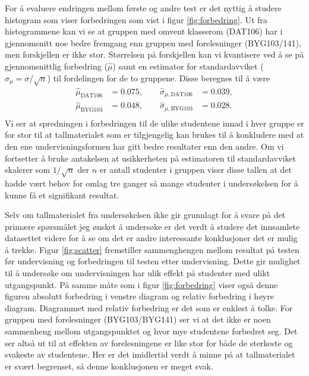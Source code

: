 \documentclass[a4paper,norsk,12pt]{report}
\begin{document}
For å evaluere endringen mellom første og andre test er det nyttig å studere histogram som viser forbedringen som vist i figur \ref{fig:forbedring}. Ut fra histogrammene kan vi se at gruppen med omvent klasserom (DAT106) har i gjennomsnitt noe bedre fremgang enn gruppen med forelesninger (BYG103/141), men forskjellen er ikke stor. Størrelsen på forskjellen kan vi kvantisere ved å se på gjennomsnittlig forbedring ($\hat{\mu}$) samt en estimator for standardavviket ($\hat{\sigma}_\mu = \sigma/\sqrt{n}$) til fordelingen for de to gruppene. Disse beregnes til å være
\begin{displaymath}
\begin{aligned}
	\hat{\mu}_\text{DAT106} &= 0.075,\quad\quad \hat{\sigma}_{\mu,\text{DAT106}} &= 0.039, \\
	\hat{\mu}_\text{BYG103} &= 0.048,\quad\quad \hat{\sigma}_{\mu,\text{BYG103}} &= 0.028. \\
\end{aligned}
\end{displaymath}
Vi ser at spredningen i forbedringen til de ulike studentene innad i hver gruppe er for stor til at tallmaterialet som er tilgjengelig kan brukes til å konkludere med at den ene undervisningsformen har gitt bedre resultater enn den andre. Om vi fortsetter å bruke antakelsen at usikkerheten på estimatoren til standardavviket skalerer som $1/\sqrt{n}$ der $n$ er antall studenter i gruppen viser disse tallen at det hadde vært behov for omlag tre ganger så mange studenter i undersøkelsen for å kunne få et signifikant resultat.

Selv om tallmaterialet fra undersøkelsen ikke gir grunnlagt for å svare på det primære spørsmålet jeg ønsket å undersøke er det verdt å studere det innsamlete datasettet videre for å se om det er andre interessante konklusjoner det er mulig å trekke. Figur \ref{fig:scatter} fremstiller sammenghengen mellom resultat på testen før undervisning og forbedringen til testen etter undervisning. Dette gir mulighet til å undersøke om undervisningen har ulik effekt på studenter med ulikt utgangspunkt. På samme måte som i figur \ref{fig:forbedring} viser også denne figuren absolutt forbedring i venstre diagram og relativ forbedring i høyre diagram. Diagrammet med relativ forbedring er det som er enklest å tolke. For gruppen med forelesninger (BYG103/BYG141) ser vi at det ikke er noen sammenheng mellom utgangspunktet og hvor mye studentene forbedret seg. Det ser altså ut til at effekten av forelesningene er like stor for både de sterkeste og svakeste av studentene. Her er det imidlertid verdt å minne på at tallmaterialet er svært begrenset, så denne konklusjonen er meget svak.
\end{document}
